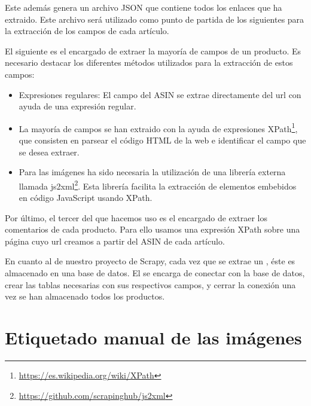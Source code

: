 Este  además genera un archivo JSON que contiene todos los enlaces que ha extraido. Este archivo será utilizado como punto de partida de los siguientes  para la extracción de los campos de cada artículo.


El siguiente  es el encargado de extraer la mayoría de campos de un producto. Es necesario destacar los diferentes métodos utilizados para la extracción de estos campos:

\begin{itemize}
    \item Expresiones regulares: El campo del ASIN se extrae directamente del url con ayuda de una expresión regular.
    \item La mayoría de campos se han extraido con la ayuda de expresiones XPath\footnote{\url{https://es.wikipedia.org/wiki/XPath}}, que consisten en parsear el código HTML de la web e identificar el campo que se desea extraer.
    \item Para las imágenes ha sido necesaria la utilización de una librería externa llamada js2xml\footnote{\url{https://github.com/scrapinghub/js2xml}}. Esta librería facilita la extracción de elementos embebidos en código JavaScript usando XPath.
\end{itemize}


Por último, el tercer  del que hacemos uso es el encargado de extraer los comentarios de cada producto. Para ello usamos una expresión XPath sobre una página cuyo url creamos a partir del ASIN de cada artículo.


En cuanto al  de nuestro proyecto de Scrapy, cada vez que se extrae un , éste es almacenado en una base de datos. El  se encarga de conectar con la base de datos, crear las tablas necesarias con sus respectivos campos, y cerrar la conexión una vez se han almacenado todos los productos.


\section{Etiquetado manual de las imágenes}

